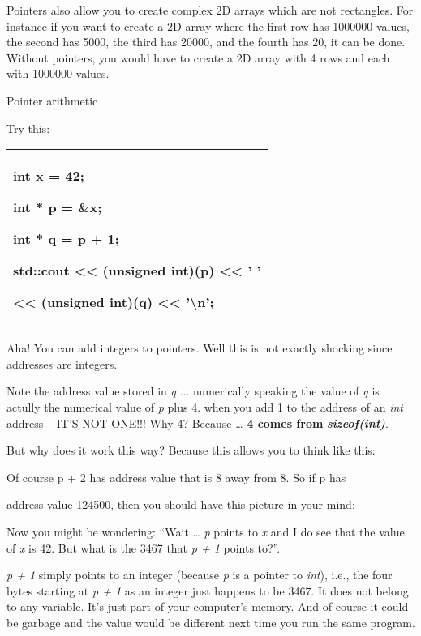 \documentclass[
]{article}
\begin{document}
Pointers also allow you to create complex 2D arrays which are not
rectangles. For instance if you want to create a 2D array where the
first row has 1000000 values, the second has 5000, the third has 20000,
and the fourth has 20, it can be done. Without pointers, you would have
to create a 2D array with 4 rows and each with 1000000 values.

Pointer arithmetic

Try this:

\begin{longtable}[]{@{}l@{}}
\toprule
\endhead
\begin{minipage}[t]{0.97\columnwidth}\raggedright
int x = 42;

int * p = \&x;

int * q = p + 1;

std::cout \textless\textless{} (unsigned int)(p) \textless\textless{} '
'

\textless\textless{} (unsigned int)(q) \textless\textless{}
'\textbackslash n'; \strut
\end{minipage}\tabularnewline
\bottomrule
\end{longtable}

Aha! You can add integers to pointers. Well this is not exactly shocking
since addresses are integers.

Note the address value stored in \emph{q} ... numerically speaking the
value of \emph{q }is actully the numerical value of \emph{p} plus 4.
when you add 1 to the address of an \emph{int} address -- IT'S NOT
ONE!!! Why 4? Because \ldots{} \textbf{4 comes from
}\emph{\textbf{sizeof(int)}}.

But why does it work this way? Because this allows you to think like
this:

Of course p + 2 has address value that is 8 away from 8. So if p has

address value 124500, then you should have this picture in your mind:

Now you might be wondering: ``Wait \ldots{} \emph{p} points to \emph{x}
and I do see that the value of \emph{x} is 42. But what is the 3467 that
\emph{p + 1} points to?''.

\emph{p + 1} simply points to an integer (because \emph{p} is a pointer
to \emph{int}), i.e., the four bytes starting at \emph{p + 1} as an
integer just happens to be 3467. It does not belong to any variable.
It's just part of your computer's memory. And of course it could be
garbage and the value would be different next time you run the same
program.
\end{document}
